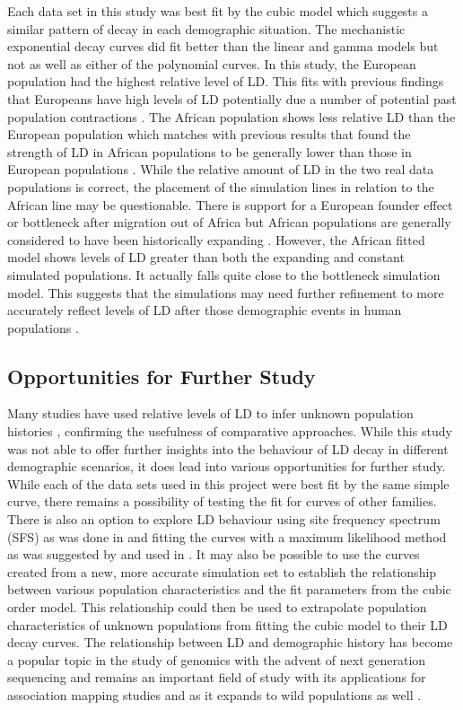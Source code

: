 \documentclass[11pt]{article}
\begin{document}
\begin{linenumbers}
Each data set in this study was best fit by the cubic model which suggests a similar pattern of decay in each demographic situation. The mechanistic exponential decay curves did fit better than the linear and gamma models but not as well as either of the polynomial curves.  In this study, the European population had the highest relative level of LD. This fits with previous findings that Europeans have high levels of LD potentially due a number of potential past population contractions \citep{reich2001linkage}. The African population shows less relative LD than the European population which matches with previous results that found the strength of LD in African populations to be generally lower than those in European populations \citep{reich2001linkage}. While the relative amount of LD in the two real data populations is correct, the placement of the simulation lines in relation to the African line may be questionable. There is support for a European founder effect or bottleneck after migration out of Africa \citep{reich2001linkage} but African populations are generally considered to have been historically expanding \citep{kruglyak1999prospects}. However, the African fitted model shows levels of LD greater than both the expanding and constant simulated populations. It actually falls quite close to the bottleneck simulation model. This suggests that the simulations may need further refinement to more accurately reflect levels of LD after those demographic events in human populations \citep{pritchard2001linkage}.       


\subsection{Opportunities for Further Study}
Many studies have used relative levels of LD to infer unknown population histories \citep{reich2001linkage,gray2009linkage, park2012linkage}, confirming the usefulness of comparative approaches. While this study was not able to offer further insights into the behaviour of LD decay in different demographic scenarios, it does lead into various opportunities for further study. While each of the data sets used in this project were best fit by the same simple curve, there remains a possibility of testing the fit for curves of other families. There is also an option to explore LD behaviour using site frequency spectrum (SFS) as was done in \cite{gray2009linkage} and fitting the curves with a maximum likelihood method as was suggested by \cite{park2012linkage} and used in \cite{hernandez2007demographic}. It may also be possible to use the curves created from a new, more accurate simulation set to establish the relationship between various population characteristics and the fit parameters from the cubic order model. This relationship could then be used to extrapolate population characteristics of unknown populations from fitting the cubic model to their LD decay curves. The relationship between LD and demographic history has become a popular topic in the study of genomics with the advent of next generation sequencing and remains an important field of study with its applications for association mapping studies and as it expands to wild populations as well \citep{slate2007admixture, gray2009linkage}. 


\end{linenumbers}
\end{document}
